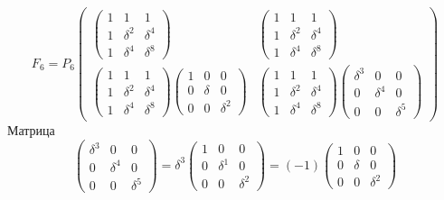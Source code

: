 \[
    F_6
    = P_6
    \begin{pmatrix}
        \begin{pmatrix}
            1 & 1        & 1        \\
            1 & \delta^2 & \delta^4 \\
            1 & \delta^4 & \delta^8
        \end{pmatrix}
         &
        \begin{pmatrix}
            1 & 1        & 1        \\
            1 & \delta^2 & \delta^4 \\
            1 & \delta^4 & \delta^8
        \end{pmatrix}
        \\
        \begin{pmatrix}
            1 & 1        & 1        \\
            1 & \delta^2 & \delta^4 \\
            1 & \delta^4 & \delta^8
        \end{pmatrix}
        \begin{pmatrix}
            1 & 0      & 0        \\
            0 & \delta & 0        \\
            0 & 0      & \delta^2
        \end{pmatrix}
         &
        \begin{pmatrix}
            1 & 1        & 1        \\
            1 & \delta^2 & \delta^4 \\
            1 & \delta^4 & \delta^8
        \end{pmatrix}
        \begin{pmatrix}
            \delta^3 & 0        & 0        \\
            0        & \delta^4 & 0        \\
            0        & 0        & \delta^5
        \end{pmatrix}
    \end{pmatrix}
\]
Матрица
\[
    \begin{pmatrix}
        \delta^3 & 0        & 0        \\
        0        & \delta^4 & 0        \\
        0        & 0        & \delta^5
    \end{pmatrix}
    = \delta^3
    \begin{pmatrix}
        1 & 0        & 0        \\
        0 & \delta^1 & 0        \\
        0 & 0        & \delta^2
    \end{pmatrix}
    = (-1)
    \begin{pmatrix}
        1 & 0      & 0        \\
        0 & \delta & 0        \\
        0 & 0      & \delta^2
    \end{pmatrix}
\]
